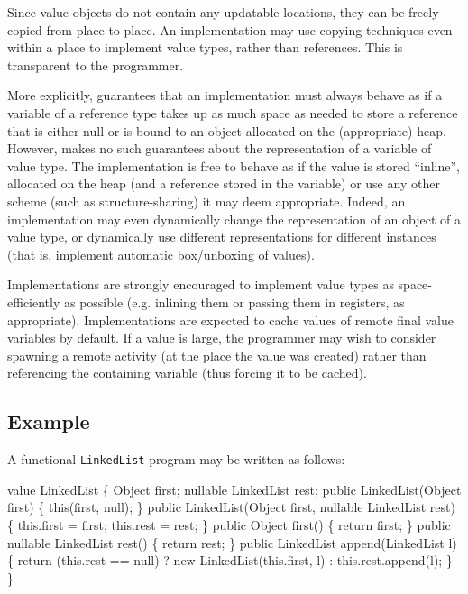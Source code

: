 Since value objects do not contain any updatable locations, they can
be freely copied from place to place. An implementation may use
copying techniques even within a place to implement value types,
rather than references. This is transparent to the programmer.

More explicitly, \Xten{} guarantees that an implementation must always
behave as if a variable of a reference type takes up as much space as
needed to store a reference that is either null or is bound to an
object allocated on the (appropriate) heap. However, \Xten{} makes no
such guarantees about the representation of a variable of value
type. The implementation is free to behave as if the value is stored
``inline'', allocated on the heap (and a reference stored in the
variable) or use any other scheme (such as structure-sharing) it may
deem appropriate. Indeed, an implementation may even dynamically
change the representation of an object of a value type, or dynamically
use different representations for different instances (that is,
implement automatic box/unboxing of values).

Implementations are strongly encouraged to implement value types as
space-efficiently as possible (e.g.{} inlining them or passing them in
registers, as appropriate).  Implementations are expected to cache
values of remote final value variables by default. If a value is
large, the programmer may wish to consider spawning a remote activity
(at the place the value was created) rather than referencing the
containing variable (thus forcing it to be cached).


\subsection{Example}
\cbstart

A functional {\tt LinkedList} program may be written as follows:

\cbend

\begin{x10}
value LinkedList  \{ 
  Object first;
  nullable LinkedList rest;
  public
     LinkedList(Object first) \{
     this(first, null);
  \}
  public
    LinkedList(Object first,  
               nullable LinkedList rest) \{
    this.first = first;
    this.rest = rest;
  \}
  public 
    Object first() \{
    return first;
  \}
  public 
    nullable LinkedList rest() \{
    return rest;
  \} 
  public
    LinkedList append(LinkedList l) \{
    return (this.rest == null) 
        ? new LinkedList(this.first, l) 
        : this.rest.append(l);
  \}
\}
\end{x10}

